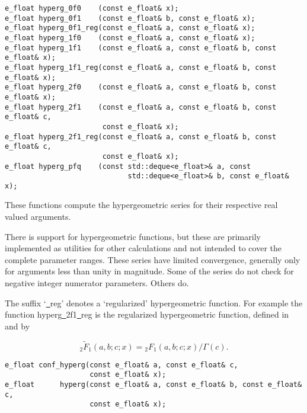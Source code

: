 \begin{lstlisting}
e_float hyperg_0f0    (const e_float& x);
e_float hyperg_0f1    (const e_float& b, const e_float& x);
e_float hyperg_0f1_reg(const e_float& a, const e_float& x);
e_float hyperg_1f0    (const e_float& a, const e_float& x);
e_float hyperg_1f1    (const e_float& a, const e_float& b, const e_float& x);
e_float hyperg_1f1_reg(const e_float& a, const e_float& b, const e_float& x);
e_float hyperg_2f0    (const e_float& a, const e_float& b, const e_float& x);
e_float hyperg_2f1    (const e_float& a, const e_float& b, const e_float& c,
                       const e_float& x);
e_float hyperg_2f1_reg(const e_float& a, const e_float& b, const e_float& c,
                       const e_float& x);
e_float hyperg_pfq    (const std::deque<e_float>& a, const 
                             std::deque<e_float>& b, const e_float& x);
\end{lstlisting}

\vspace{6.0pt}

 These functions compute the hypergeometric series
for their respective real valued arguments.

\vspace{6.0pt}

 There is support for hyper\-geometric functions,
but these are primarily implemented as utilities for other calculations
and not intended to cover the complete parameter ranges. These series
have limited convergence, generally only for arguments less than unity
in magnitude. Some of the series do not check for negative integer
numerator parameters. Others do.

\vspace{6.0pt}

 The suffix `{\courier \underline\ reg}' denotes a
`regularized' hyper\-geometric function. For example the function
{\courier hyperg\underline\ 2f1\underline\ reg} is the regularized
hyper\-geometric function, defined in \cite{wolfram:textbook} and
\cite{wolframfunctions:website} by

\begin{equation}
_{2}\widetilde{F}_{1}(a, b; c; x) = {_{2}F_{1}}(a, b; c; x)/\Gamma(c).
\end{equation}

\begin{lstlisting}
e_float conf_hyperg(const e_float& a, const e_float& c,
                    const e_float& x);
e_float      hyperg(const e_float& a, const e_float& b, const e_float& c,
                    const e_float& x);
\end{lstlisting}

